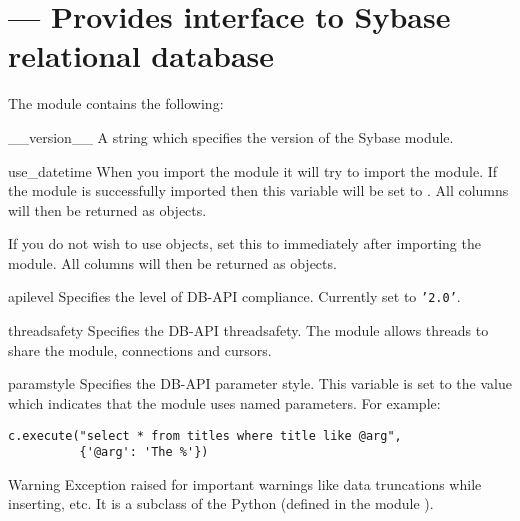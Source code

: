 \section{ --- Provides interface to Sybase relational database}



The  module contains the following:

\begin{datadesc}{__version__}
A string which specifies the version of the Sybase module.
\end{datadesc}

\begin{datadesc}{use_datetime}
When you import the  module it will try to import the
 module.  If the  module is
successfully imported then this variable will be set to .  All
 columns will then be returned as
 objects.

If you do not wish to use  objects, set
this to  immediately after importing the 
module.  All  columns will then be returned as
 objects.
\end{datadesc}

\begin{datadesc}{apilevel}
Specifies the level of DB-API compliance.  Currently set to
\texttt{'2.0'}.
\end{datadesc}

\begin{datadesc}{threadsafety}
Specifies the DB-API threadsafety.  The  module allows
threads to share the module, connections and cursors.
\end{datadesc}

\begin{datadesc}{paramstyle}
Specifies the DB-API parameter style.  This variable is set to the
value  which indicates that the  module
uses named parameters.  For example:

\begin{verbatim}
c.execute("select * from titles where title like @arg",
          {'@arg': 'The %'})
\end{verbatim}
\end{datadesc}

\begin{excdesc}{Warning}
Exception raised for important warnings like data truncations while
inserting, etc.  It is a subclass of the Python 
(defined in the module ).
\end{excdesc}

